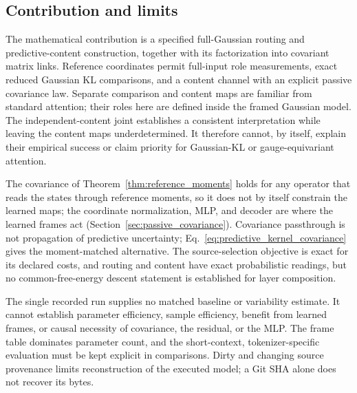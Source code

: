 \documentclass[twoside,11pt]{article}
\begin{document}
\subsection{Contribution and limits}
\label{sec:limitations}

The mathematical contribution is a specified full-Gaussian routing and predictive-content construction, together with its factorization into covariant matrix links. Reference coordinates permit full-input role measurements, exact reduced Gaussian KL comparisons, and a content channel with an explicit passive covariance law. Separate comparison and content maps are familiar from standard attention; their roles here are defined inside the framed Gaussian model. The independent-content joint establishes a consistent interpretation while leaving the content maps underdetermined. It therefore cannot, by itself, explain their empirical success or claim priority for Gaussian-KL or gauge-equivariant attention.

The covariance of Theorem~\ref{thm:reference_moments} holds for any operator that reads the states through reference moments, so it does not by itself constrain the learned maps; the coordinate normalization, MLP, and decoder are where the learned frames act (Section~\ref{sec:passive_covariance}). Covariance passthrough is not propagation of predictive uncertainty; Eq.~\eqref{eq:predictive_kernel_covariance} gives the moment-matched alternative. The source-selection objective is exact for its declared costs, and routing and content have exact probabilistic readings, but no common-free-energy descent statement is established for layer composition.

The single recorded run supplies no matched baseline or variability estimate. It cannot establish parameter efficiency, sample efficiency, benefit from learned frames, or causal necessity of covariance, the residual, or the MLP. The frame table dominates parameter count, and the short-context, tokenizer-specific evaluation must be kept explicit in comparisons. Dirty and changing source provenance limits reconstruction of the executed model; a Git SHA alone does not recover its bytes.
\end{document}
